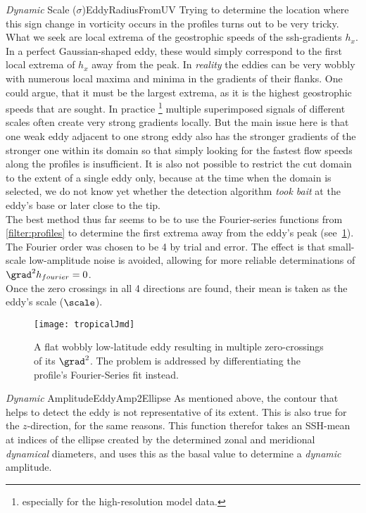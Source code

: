 \begin{filter}{\textit{Dynamic} Scale ($\sigma$)}{EddyRadiusFromUV}
Trying to determine the location where this sign change in vorticity occurs in the profiles turns out to be very tricky. What we seek are local extrema of the geostrophic speeds \ie of the ssh-gradients $h_x$. In a perfect Gaussian-shaped eddy, these would simply correspond to the first local extrema of $h_x$ away from the peak. In \textit{reality} the eddies can be very wobbly with numerous local maxima and minima in the gradients of their flanks. One could argue, that it must be the largest extrema, as it is the highest geostrophic speeds that are sought. In practice \footnote{especially for the high-resolution model data.} multiple superimposed signals of different scales often create very strong gradients locally. But the main issue here is that one weak eddy adjacent to one strong eddy also has the stronger gradients of the stronger one within its domain so that simply looking for the fastest flow speeds along the profiles is insufficient. It is also not possible to restrict the cut domain to the extent of a single eddy only, because at the time when the domain is selected, we do not know yet whether the detection algorithm \textit{took bait} at the eddy's base or later close to the tip. \\
The best method thus far seems to be to use the Fourier-series functions from \cref{filter:profiles} to determine the first extrema away from the eddy's peak (see~\cref{fig:tropicalJmd}). The Fourier order was chosen to be 4 by trial and error. The effect is that small-scale low-amplitude noise is avoided, allowing for more reliable determinations of $\grad^2 h_{fourier} = 0$.       \\
 Once the zero crossings in all 4 directions are found, their mean is taken as the eddy's scale ($\scale$).
 \end{filter}\newline
\begin{figure}
	\texttt{[image: tropicalJmd]}
	\caption{A flat wobbly low-latitude eddy resulting in multiple zero-crossings of its $\grad^2$. The problem is addressed by differentiating the profile's Fourier-Series fit instead.}
	\label{fig:tropicalJmd}
\end{figure}
\begin{filter}{\textit{Dynamic} Amplitude}{EddyAmp2Ellipse}
\label{filter:ampDyn}
As mentioned above, the contour that helps to detect the eddy is not
representative of its extent. This is also true for the $z$-direction, for the
same reasons. This function therefor takes an SSH-mean at indices of the ellipse
created by the determined zonal and meridional \textit{dynamical} diameters,
and uses this as the basal value to determine a \textit{dynamic} amplitude.
\end{filter}\newline
